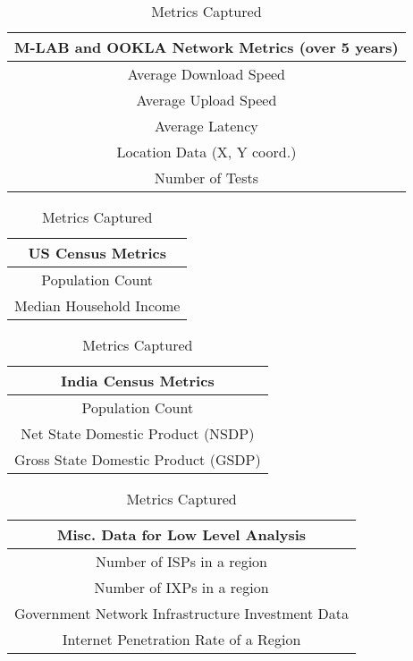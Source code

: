 \documentclass[conference]{IEEEtran}
\begin{document}
\begin{table}[htbp]
    \caption{Metrics Captured}
    \label{tab:metrics_table}
\begin{center}
    \begin{tabular}{|c|}
        \hline
        \multicolumn{1}{|c|}{\textbf{M-LAB and OOKLA Network Metrics (over 5 years)}} \\
        \hline
        Average Download Speed \\
        \hline
        Average Upload Speed \\
        \hline
        Average Latency \\
        \hline
        Location Data (X, Y coord.) \\
        \hline
        Number of Tests \\
        \hline
    \end{tabular}
    
    \bigskip %
    
    \begin{tabular}{|c|}
        \hline
        \multicolumn{1}{|c|}{\textbf{US Census Metrics}} \\
        \hline
        Population Count \\
        \hline
        Median Household Income \\
        \hline
    \end{tabular}
    
    \bigskip %
    
    \begin{tabular}{|c|}
        \hline
        \multicolumn{1}{|c|}{\textbf{India Census Metrics}} \\
        \hline
        Population Count \\
        \hline
        Net State Domestic Product (NSDP) \\
        \hline
        Gross State Domestic Product (GSDP) \\
        \hline
    \end{tabular}

    \bigskip %

    \begin{tabular}{|c|}
        \hline
        \multicolumn{1}{|c|}{\textbf{Misc. Data for Low Level Analysis}} \\
        \hline
        Number of ISPs in a region \\
        \hline
        Number of IXPs in a region \\
        \hline
        Government Network Infrastructure Investment Data \\
        \hline
        Internet Penetration Rate of a Region \\
        \hline
    \end{tabular}

    \bigskip %
\end{center}
\end{table}
\end{document}
